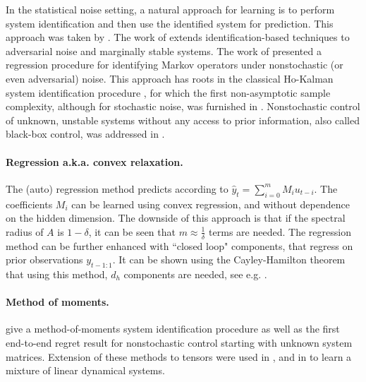 \documentclass[11pt]{article}
\numberwithin{equation}{section}
\begin{document}
In the statistical noise setting, a natural approach for learning is to perform system identification and then use the identified system for prediction. This approach was taken by \cite{simchowitz2018learning,pmlr-v119-simchowitz20a,pmlr-v97-sarkar19a}. The work of \cite{ghai2020no} extends identification-based techniques to adversarial noise and marginally stable systems. 
The work of \cite{simchowitz2019learning} presented a regression procedure for identifying Markov operators under nonstochastic (or even adversarial) noise. This approach has roots in the classical Ho-Kalman system identification procedure \cite{ho1966effective}, for which the first non-asymptotic sample complexity, although for stochastic noise, was furnished in \cite{oymak2019non}.  Nonstochastic control of unknown, unstable systems without any access to prior information, also called black-box control, was addressed in \cite{chen2021black}.





\paragraph{Regression a.k.a. convex relaxation. } The (auto) regression method predicts according to $\hat{y}_{t} = \sum_{i=0}^m M_i u_{t-i}$. The coefficients $M_i$ can be learned using convex regression, and without dependence on the hidden dimension. The downside of this approach is that if the spectral radius of $A$ is $1-\delta$, it can be seen that $m \approx \frac{1}{\delta}$ terms are needed. 
The regression method can be further enhanced with ``closed loop" components, that regress on prior observations $y_{t-1:1}$. It can be shown using the Cayley-Hamilton theorem that using this method, $d_h$ components are needed, see e.g.  \cite{kozdoba2019line,hazan2017learning}.


 
\paragraph{Method of moments.}

\cite{hazan2019nonstochastic} give a method-of-moments system identification procedure as well as the first end-to-end regret result for nonstochastic control starting with unknown system matrices.  Extension of these methods to tensors were used in \cite{bakshi2023new}, and in \cite{bakshi2023tensor} to learn a mixture of linear dynamical systems. 
\end{document}
